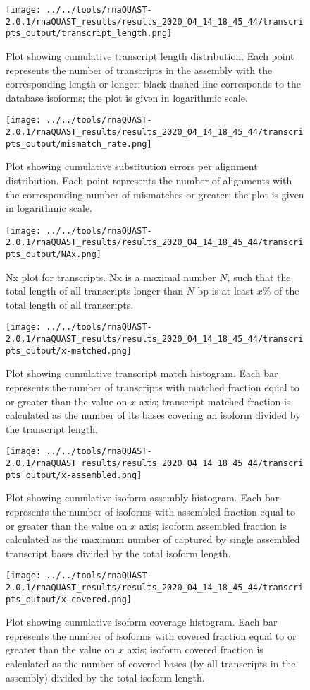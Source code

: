 \documentclass[12pt,a4paper]{article}
\begin{document}
\FloatBarrier\clearpage{}
\begin{figure}[t]\centering\texttt{[image: ../../tools/rnaQUAST-2.0.1/rnaQUAST\_results/results\_2020\_04\_14\_18\_45\_44/transcripts\_output/transcript\_length.png]}\caption{Plot showing cumulative transcript length distribution. Each point represents the number of transcripts in the assembly with the corresponding length or longer; black dashed line corresponds to the database isoforms; the plot is given in logarithmic scale.}\end{figure}\FloatBarrier\clearpage
\begin{figure}[t]\centering\texttt{[image: ../../tools/rnaQUAST-2.0.1/rnaQUAST\_results/results\_2020\_04\_14\_18\_45\_44/transcripts\_output/mismatch\_rate.png]}\caption{Plot showing cumulative substitution errors per alignment distribution. Each point represents the number of alignments with the corresponding number of mismatches or greater; the plot is given in logarithmic scale.}\end{figure}\FloatBarrier\clearpage
\begin{figure}[t]\centering\texttt{[image: ../../tools/rnaQUAST-2.0.1/rnaQUAST\_results/results\_2020\_04\_14\_18\_45\_44/transcripts\_output/NAx.png]}\caption{Nx plot for transcripts. Nx is a maximal number $N$, such that the total length of all transcripts longer than $N$ bp is at least $x\%$ of the total length of all transcripts.}\end{figure}\FloatBarrier\clearpage
\begin{figure}[t]\centering\texttt{[image: ../../tools/rnaQUAST-2.0.1/rnaQUAST\_results/results\_2020\_04\_14\_18\_45\_44/transcripts\_output/x-matched.png]}\caption{Plot showing cumulative transcript match histogram. Each bar represents the number of transcripts with matched fraction equal to or greater than the value on $x$ axis; transcript matched fraction is calculated as the number of its bases covering an isoform divided by the transcript length.}\end{figure}\FloatBarrier\clearpage
\begin{figure}[t]\centering\texttt{[image: ../../tools/rnaQUAST-2.0.1/rnaQUAST\_results/results\_2020\_04\_14\_18\_45\_44/transcripts\_output/x-assembled.png]}\caption{Plot showing cumulative isoform assembly histogram. Each bar represents the number of isoforms with assembled fraction equal to or greater than the value on $x$ axis; isoform assembled fraction is calculated as the maximum number of captured by single assembled transcript bases divided by the total isoform length.}\end{figure}\FloatBarrier\clearpage
\begin{figure}[t]\centering\texttt{[image: ../../tools/rnaQUAST-2.0.1/rnaQUAST\_results/results\_2020\_04\_14\_18\_45\_44/transcripts\_output/x-covered.png]}\caption{Plot showing cumulative isoform coverage histogram. Each bar represents the number of isoforms with covered fraction equal to or greater than the value on $x$ axis; isoform covered fraction is calculated as the number of covered bases (by all transcripts in the assembly) divided by the total isoform length.}\end{figure}\FloatBarrier\clearpage
\end{document}
